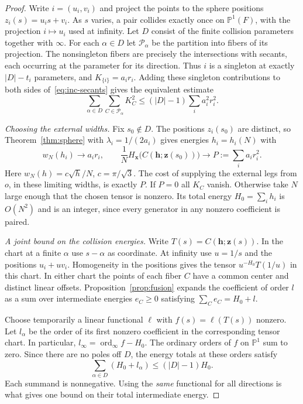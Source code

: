\begin{proof}
Write $i=(u_i,v_i)$ and project the points to the sphere positions
$z_i(s)=u_i s+v_i$. As $s$ varies, a pair collides exactly once on
$\mathbb P^1(F)$, with the projection $i\mapsto u_i$ used at infinity.
Let $D$ consist of the finite collision parameters together with
$\infty$. For each $\alpha\in D$ let $\mathcal P_\alpha$ be the
partition into fibers of its projection. The nonsingleton fibers are
precisely the intersections with secants, each occurring at the
parameter for its direction. Thus $i$ is a singleton at exactly
$|D|-t_i$ parameters, and $K_{\{i\}}=a_i r_i$. Adding these singleton
contributions to both sides of~\eqref{eq:inc-secants} gives the
equivalent estimate
\begin{equation}\label{eq:inc-fibers}
   \sum_{\alpha\in D}\sum_{C\in\mathcal P_\alpha} K_C^2
             \le (|D|-1)\sum_i a_i^2 r_i^2 .
\end{equation}

\emph{Choosing the external widths.}
Fix $s_0\notin D$. The positions $z_i(s_0)$ are distinct, so
Theorem~\ref{thm:sphere} with $\lambda_i=1/(2a_i)$ gives energies
$h_i=h_i(N)$ with
\begin{equation}\label{eq:inc-saturation}
 w_N(h_i)\longrightarrow a_i r_i,\qquad
 \frac{1}{N}H_{\mathbf x}\bigl(C(\mathbf h;\mathbf z(s_0))\bigr)
              \longrightarrow P:=\sum_i a_i r_i^2 .
\end{equation}
Here $w_N(h)=c\sqrt h/N$, $c=\pi/\sqrt3$. The cost of supplying the
external legs from $o$, in these limiting widths, is exactly $P$.
If $P=0$ all $K_C$ vanish. Otherwise take $N$ large enough that the
chosen tensor is nonzero. Its total energy $H_0=\sum_i h_i$ is
$O(N^2)$ and is an integer, since every generator in any nonzero
coefficient is paired.

\emph{A joint bound on the collision energies.}
Write $T(s)=C(\mathbf h;\mathbf z(s))$. In the chart at a finite
$\alpha$ use $s-\alpha$ as coordinate. At infinity use $u=1/s$ and
the positions $u_i+u v_i$. Homogeneity in the positions gives the
tensor $u^{-H_0}T(1/u)$ in this chart. In either chart the points of
each fiber $C$ have a common center and distinct linear offsets.
Proposition~\ref{prop:fusion} expands the coefficient of order $l$
as a sum over intermediate energies $e_C\ge0$ satisfying
$\sum_C e_C=H_0+l$.

Choose temporarily a linear functional $\ell$ with
$f(s)=\ell(T(s))$ nonzero. Let $l_\alpha$ be the order of its first
nonzero coefficient in the corresponding tensor chart. In particular,
$l_\infty=\operatorname{ord}_\infty f-H_0$. The ordinary orders of
$f$ on $\mathbb P^1$ sum to zero. Since there are no poles off $D$,
the energy totals at these orders satisfy
\begin{equation}\label{eq:inc-orders}
  \sum_{\alpha\in D}(H_0+l_\alpha)\le (|D|-1) H_0 .
\end{equation}
Each summand is nonnegative. Using the \emph{same} functional for
all directions is what gives one bound on their total intermediate
energy.


\end{proof}
